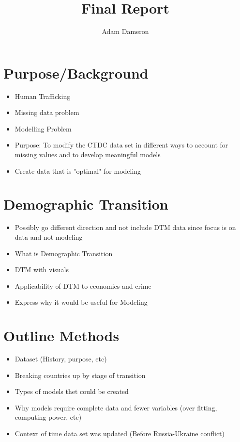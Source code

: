 \documentclass{article} %
\title{Final Report}
\author{
	Adam Dameron
}
\begin{document}
	
	
	\maketitle
	
	\begin{abstract}
		
	\end{abstract}
	
	
	\section{Purpose/Background}
	\begin{itemize}
		\item Human Trafficking
		\item Missing data problem
		\item Modelling Problem
		\item Purpose: To modify the CTDC data set in different ways to account for missing values and to develop meaningful models
		\item Create data that is "optimal" for modeling
	\end{itemize}
	
	\section{Demographic Transition} 
	\begin{itemize}
		\item Possibly go different direction and not include DTM data since focus is on data and not modeling
		\item What is Demographic Transition
		\item DTM with visuals
		\item Applicability of DTM to economics and crime
		\item Express why it would be useful for Modeling
	\end{itemize}
	
	\section{Outline Methods}
	
	\begin{itemize}
		\item Dataset (History, purpose, etc)
		\item Breaking countries up by stage of transition
		\item Types of models thet could be created
		\item Why models require complete data and fewer variables (over fitting, computing power, etc)
		\item Context of time data set was updated (Before Russia-Ukraine conflict)
	\end{itemize}
\end{document}
